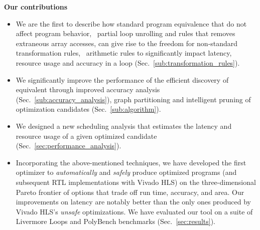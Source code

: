 \begin{trivlist}\item{\bf Our contributions}

\begin{itemize}

    \item We are the first to describe how standard program equivalence
    that do not affect program behavior, \eg~partial loop unrolling and
    rules that removes extraneous array accesses, can give rise to the
    freedom for non-standard transformation rules, \eg~arithmetic rules to
    significantly impact latency, resource usage and accuracy in a loop
    (Sec.~\ref{sub:transformation_rules}).

    \item We significantly improve the performance of the efficient
    discovery of equivalent through improved accuracy analysis
    (Sec.~\ref{sub:accuracy_analysis}), graph partitioning and intelligent
    pruning of optimization candidates (Sec.~\ref{sub:algorithm}).

    \item We designed a new scheduling analysis that estimates
    the latency and resource usage of a given optimized candidate
    (Sec.~\ref{sec:performance_analysis}).

    \item Incorporating the above-mentioned techniques, we have developed
    the first optimizer to \emph{automatically} and \emph{safely} produce
    optimized programs (and subsequent RTL implementations with Vivado HLS) on
    the three-dimensional Pareto frontier of options that trade off run time,
    accuracy, and area.  Our improvements on latency are notably better than
    the only ones produced by Vivado HLS's \emph{unsafe} optimizations. We have
    evaluated our tool on a suite of Livermore Loops and PolyBench benchmarks
    (Sec.~\ref{sec:results}).

\end{itemize}

\end{trivlist}

